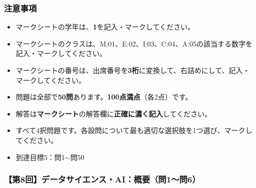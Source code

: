 \documentclass[b4paper,7pt,twocolumn,landscape]{jsarticle}
\begin{document}

\subsubsection*{注意事項}
{
\begin{itemize}
  \item マークシートの学年は、\textbf{1}を記入・マークしてください。
  \item マークシートのクラスは、M:01、E:02、I:03、C:04、A:05の該当する数字を記入・マークしてください。
  \item マークシートの番号は、出席番号を\textbf{3桁}に変換して、右詰めにして、記入・マークしてください。
  \item 問題は全部で\textbf{50問}あります。\textbf{100点満点}（各2点）です。
  \item 解答は\textbf{マークシート}の解答欄に\textbf{正確に濃く記入}してください。
  \item すべて4択問題です。各設問について最も適切な選択肢を1つ選び、マークしてください。
  \item 到達目標5：問1$\sim$問50
\end{itemize}
}

\subsubsection*{【第8回】データサイエンス・AI：概要（問1〜問6）}
\end{document}
